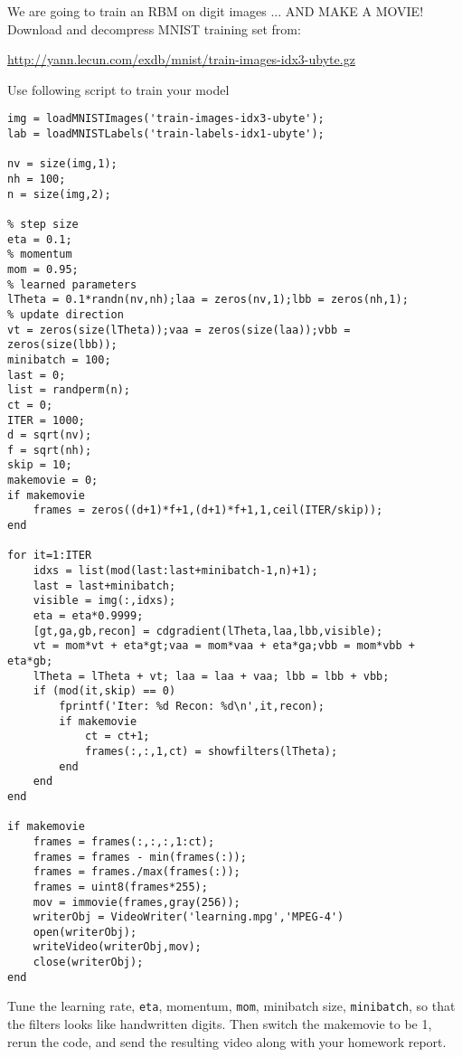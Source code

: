\documentclass{article}
\begin{document}
\newproblem{2pt}
We are going to train an RBM on digit images ... AND MAKE A MOVIE!
Download and decompress  MNIST training set from:

\url{http://yann.lecun.com/exdb/mnist/train-images-idx3-ubyte.gz}

Use following script to train your model
\begin{verbatim}
img = loadMNISTImages('train-images-idx3-ubyte');
lab = loadMNISTLabels('train-labels-idx1-ubyte');

nv = size(img,1);
nh = 100;
n = size(img,2);

% step size
eta = 0.1;
% momentum
mom = 0.95;
% learned parameters
lTheta = 0.1*randn(nv,nh);laa = zeros(nv,1);lbb = zeros(nh,1);
% update direction
vt = zeros(size(lTheta));vaa = zeros(size(laa));vbb = zeros(size(lbb));
minibatch = 100;
last = 0;
list = randperm(n);
ct = 0;
ITER = 1000;
d = sqrt(nv);
f = sqrt(nh);
skip = 10;
makemovie = 0;
if makemovie
    frames = zeros((d+1)*f+1,(d+1)*f+1,1,ceil(ITER/skip));
end

for it=1:ITER
    idxs = list(mod(last:last+minibatch-1,n)+1);
    last = last+minibatch;
    visible = img(:,idxs);
    eta = eta*0.9999;
    [gt,ga,gb,recon] = cdgradient(lTheta,laa,lbb,visible);
    vt = mom*vt + eta*gt;vaa = mom*vaa + eta*ga;vbb = mom*vbb + eta*gb;
    lTheta = lTheta + vt; laa = laa + vaa; lbb = lbb + vbb;
    if (mod(it,skip) == 0)
        fprintf('Iter: %d Recon: %d\n',it,recon);
        if makemovie
            ct = ct+1;
            frames(:,:,1,ct) = showfilters(lTheta);
        end
    end
end

if makemovie
    frames = frames(:,:,:,1:ct);
    frames = frames - min(frames(:));
    frames = frames./max(frames(:));
    frames = uint8(frames*255);
    mov = immovie(frames,gray(256));
    writerObj = VideoWriter('learning.mpg','MPEG-4')
    open(writerObj);
    writeVideo(writerObj,mov);
    close(writerObj);
end
\end{verbatim}
Tune the learning rate, \verb|eta|, momentum, \verb|mom|, minibatch size, \verb|minibatch|, so that
the filters looks like handwritten digits. Then switch the makemovie to be 1, rerun the code, and send the resulting video along with your homework report.
\end{document}
